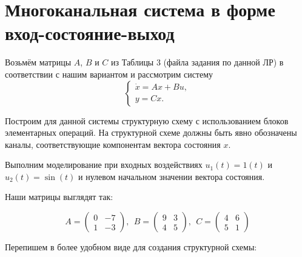 \section{Многоканальная система в форме вход-состояние-выход}
Возьмём матрицы $A$, $B$ и $C$ из Таблицы 3 (файла задания по данной ЛР) в соответствии с нашим вариантом и рассмотрим систему
\[
\begin{cases}
\dot{x} = Ax + Bu, \\
y = Cx.
\end{cases}
\]

Построим для данной системы структурную схему с использованием блоков элементарных операций. На структурной схеме должны быть явно обозначены каналы, соответствующие компонентам вектора состояния $x$.

Выполним моделирование при входных воздействиях $u_1(t) = 1(t)$ и $u_2(t) = \sin(t)$ и нулевом начальном значении вектора состояния.

Наши матрицы выглядят так:

$$
A=\left(\begin{array}{cc}
0 & -7\\
1 & -3
\end{array}\right),~~B=\left(\begin{array}{cc}
9 & 3\\
4 & 5
\end{array}\right),~~C=\left(\begin{array}{cc}
4 & 6\\
5 & 1
\end{array}\right)$$

Перепишем в более удобном виде для создания структурной схемы:

